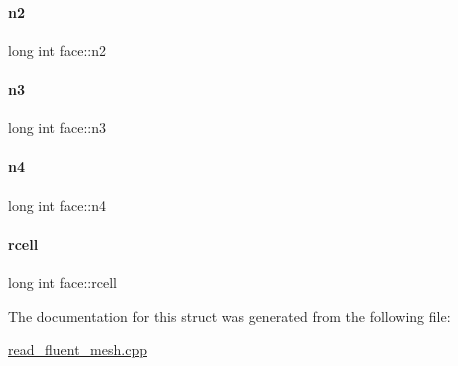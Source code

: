 \paragraph{\texorpdfstring{n2}{n2}}
{\footnotesize\ttfamily long int face\+::n2}

\mbox{\label{structface_a977e1dabf4dbd20912cebeb8b34dd21e}} 
\paragraph{\texorpdfstring{n3}{n3}}
{\footnotesize\ttfamily long int face\+::n3}

\mbox{\label{structface_a1470972e9d910a99e760f0dedf794eb0}} 
\paragraph{\texorpdfstring{n4}{n4}}
{\footnotesize\ttfamily long int face\+::n4}

\mbox{\label{structface_aa041b5f2bac2fb196c7e6722c2b4bb51}} 
\paragraph{\texorpdfstring{rcell}{rcell}}
{\footnotesize\ttfamily long int face\+::rcell}



The documentation for this struct was generated from the following file\+:\begin{DoxyCompactItemize}
\item 
\hyperlink{read__fluent__mesh_8cpp}{read\+\_\+fluent\+\_\+mesh.\+cpp}\end{DoxyCompactItemize}
